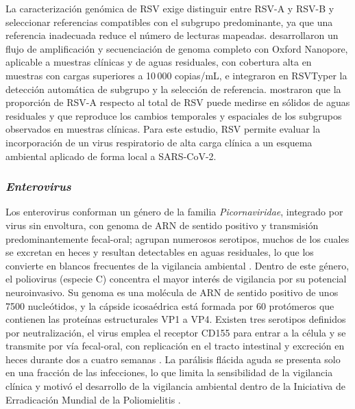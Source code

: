 La caracterización genómica de RSV exige distinguir entre RSV-A y RSV-B y seleccionar referencias compatibles con el subgrupo predominante, ya que una referencia inadecuada reduce el número de lecturas mapeadas.  desarrollaron un flujo de amplificación y secuenciación de genoma completo con Oxford Nanopore, aplicable a muestras clínicas y de aguas residuales, con cobertura alta en muestras con cargas superiores a 10\,000 copias/mL, e integraron en RSVTyper la detección automática de subgrupo y la selección de referencia.  mostraron que la proporción de RSV-A respecto al total de RSV puede medirse en sólidos de aguas residuales y que reproduce los cambios temporales y espaciales de los subgrupos observados en muestras clínicas. Para este estudio, RSV permite evaluar la incorporación de un virus respiratorio de alta carga clínica a un esquema ambiental aplicado de forma local a SARS-CoV-2.

\subsubsection{\textit{Enterovirus}}

Los enterovirus conforman un género de la familia \textit{Picornaviridae}, integrado por virus sin envoltura, con genoma de ARN de sentido positivo y transmisión predominantemente fecal-oral; agrupan numerosos serotipos, muchos de los cuales se excretan en heces y resultan detectables en aguas residuales, lo que los convierte en blancos frecuentes de la vigilancia ambiental \cite{Kissova_2022}. Dentro de este género, el poliovirus (especie C) concentra el mayor interés de vigilancia por su potencial neuroinvasivo. Su genoma es una molécula de ARN de sentido positivo de unos 7500 nucleótidos, y la cápside icosaédrica está formada por 60 protómeros que contienen las proteínas estructurales VP1 a VP4. Existen tres serotipos definidos por neutralización, el virus emplea el receptor CD155 para entrar a la célula y se transmite por vía fecal-oral, con replicación en el tracto intestinal y excreción en heces durante dos a cuatro semanas \cite{Martin_2016}. La parálisis flácida aguda se presenta solo en una fracción de las infecciones, lo que limita la sensibilidad de la vigilancia clínica y motivó el desarrollo de la vigilancia ambiental dentro de la Iniciativa de Erradicación Mundial de la Poliomielitis \cite{Martin_2016,Asghar_2014}.

